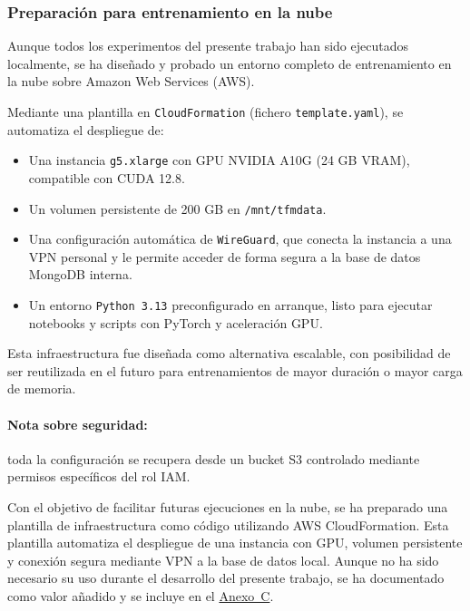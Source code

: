 
\subsubsection{Preparación para entrenamiento en la nube}

Aunque todos los experimentos del presente trabajo han sido ejecutados localmente, se ha diseñado y probado un entorno completo de entrenamiento en la nube sobre Amazon Web Services (AWS).

Mediante una plantilla en \texttt{CloudFormation} (fichero \texttt{template.yaml}), se automatiza el despliegue de:

\begin{itemize}
	\item Una instancia \texttt{g5.xlarge} con GPU NVIDIA A10G (24 GB VRAM), compatible con CUDA 12.8.
	\item Un volumen persistente de 200 GB en \texttt{/mnt/tfmdata}.
	\item Una configuración automática de \texttt{WireGuard}, que conecta la instancia a una VPN personal y le permite acceder de forma segura a la base de datos MongoDB interna.
	\item Un entorno \texttt{Python 3.13} preconfigurado en arranque, listo para ejecutar notebooks y scripts con PyTorch y aceleración GPU.
\end{itemize}


Esta infraestructura fue diseñada como alternativa escalable, con posibilidad de ser reutilizada en el futuro para entrenamientos de mayor duración o mayor carga de memoria.

\paragraph{Nota sobre seguridad:} toda la configuración se recupera desde un bucket S3 controlado mediante permisos específicos del rol IAM.

Con el objetivo de facilitar futuras ejecuciones en la nube, se ha preparado una plantilla de infraestructura como código utilizando AWS CloudFormation. Esta plantilla automatiza el despliegue de una instancia con GPU, volumen persistente y conexión segura mediante VPN a la base de datos local. Aunque no ha sido necesario su uso durante el desarrollo del presente trabajo, se ha documentado como valor añadido y se incluye en el \hyperref[anexo:plantilla_aws]{Anexo~C}.

